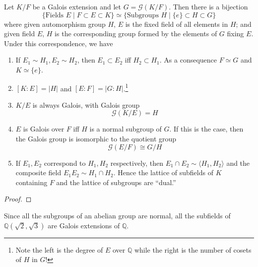   \begin{theorem}
    Let $K/F$ be a Galois extension and let $G = \mathcal{G}(K/F)$. Then there is a bijection 
    \begin{equation}
      \{\text{Fields } E \mid F \subset E \subset K \} \simeq \{\text{Subgroups } H \mid \{e\} \subset H \subset G \}
    \end{equation}
    where given automorphism group $H$, $E$ is the fixed field of all elements in $H$; and given field $E$, $H$ is the corresponding group formed by the elements of $G$ fixing $E$. 
    Under this correspondence, we have 
    \begin{enumerate}
      \item If $E_1 \sim H_1, E_2 \sim H_2$, then $E_1 \subset E_2$ iff $H_2 \subset H_1$. As a consequence $F \simeq G$ and $K \simeq \{e\}$. 

      \item $[K:E] = |H|$ and $[E:F] = |G:H|$.\footnote{Note the left is the degree of $E$ over $\mathbb{Q}$ while the right is the number of cosets of $H$ in $G$!} 
      \item $K/E$ is always Galois, with Galois group 
        \begin{equation}
          \mathcal{G}(K/E) = H
        \end{equation}

      \item $E$ is Galois over $F$ iff $H$ is a normal subgroup of $G$. If this is the case, then the Galois group is isomorphic to the quotient group 
        \begin{equation}
          \mathcal{G}(E/F) \cong G/H
        \end{equation}

      \item If $E_1, E_2$ correspond to $H_1, H_2$ respectively, then $E_1 \cap E_2 \sim \langle H_1, H_2 \rangle$ and the composite field $E_1 E_2 \sim H_1 \cap H_2$. Hence the lattice of subfields of $K$ containing $F$ and the lattice of subgroups are ``dual.'' 
    \end{enumerate}
  \end{theorem}
  \begin{proof}
    
  \end{proof}

  \begin{example}[]
    Since all the subgroups of an abelian group are normal, all the subfields of $\mathbb{Q}(\sqrt{2}, \sqrt{3})$ are Galois extensions of $\mathbb{Q}$. 
  \end{example}

